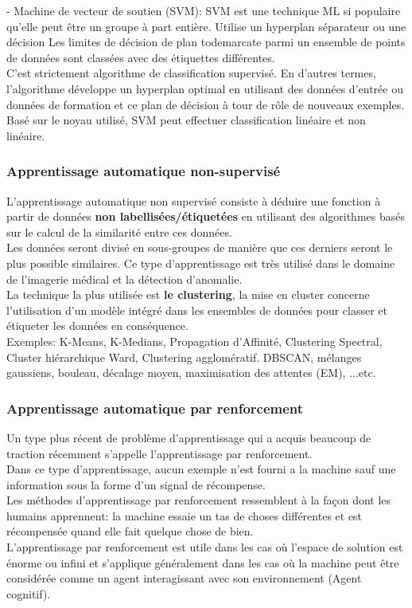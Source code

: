         - Machine de vecteur de soutien (SVM): SVM est une technique ML si populaire qu'elle peut être un groupe à part entière. Utilise un hyperplan séparateur ou une décision Les limites de décision de plan todemarcate parmi un ensemble de points de données sont classées avec des étiquettes différentes.\\ 
        C'est strictement algorithme de classification supervisé. En d'autres termes, l'algorithme développe un hyperplan optimal en utilisant des données d'entrée ou données de formation et ce plan de décision à tour de rôle de nouveaux exemples.\\ 
        Basé sur le noyau utilisé, SVM peut effectuer classification linéaire et non linéaire.\cite{surveymachinelearningclassification}


        \subsubsection{Apprentissage automatique non-supervisé}
        L'apprentissage automatique non supervisé consiste à déduire une fonction à partir de données \textbf{non labellisées/étiquetées} en utilisant des algorithmes basés sur le calcul de la similarité entre ces données.\\
        Les données seront divisé en sous-groupes de manière que ces derniers seront le plus possible similaires.
        Ce type d'apprentissage est très utilisé dans le domaine de l'imagerie médical et la détection d'anomalie.\\
        La technique la plus utilisée est \textbf{le clustering}, la mise en cluster concerne l'utilisation d'un modèle intégré dans les ensembles de données pour classer et étiqueter les données en conséquence.\\
        Exemples: K-Means, K-Medians, Propagation d'Affinité, Clustering Spectral, Cluster hiérarchique Ward, Clustering agglomératif. DBSCAN, mélanges gaussiens, bouleau, décalage moyen, maximisation des attentes (EM), ...etc.\cite{surveymachinelearningclustering}

        \subsubsection{Apprentissage automatique par renforcement}
        Un type plus récent de problème d'apprentissage qui a acquis beaucoup de traction récemment s'appelle l'apprentissage par renforcement.\\ 
        Dans ce type d'apprentissage, aucun exemple n'est fourni a la machine sauf une information sous la forme d'un signal de récompense.\\ 
        Les méthodes d'apprentissage par renforcement ressemblent à la façon dont les humains apprennent: la machine essaie un tas de choses différentes et est récompensée quand elle fait quelque chose de bien.\\
        L'apprentissage par renforcement est utile dans les cas où l'espace de solution est énorme ou infini et s'applique généralement dans les cas où la machine peut être considérée comme un agent interagissant avec son environnement (Agent cognitif).


